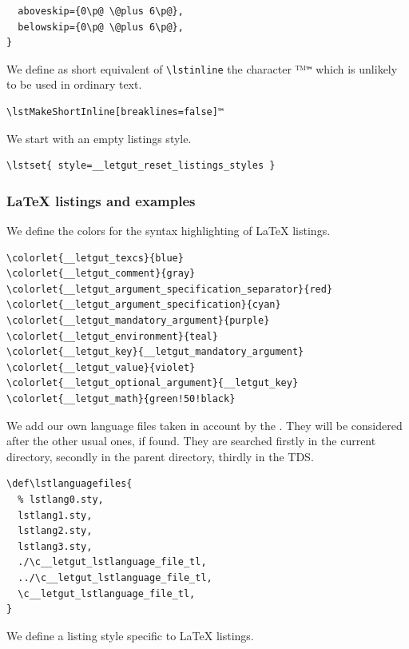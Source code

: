 \documentclass{letgut}
\begin{document}
\begin{lstlisting}
  aboveskip={0\p@ \@plus 6\p@},
  belowskip={0\p@ \@plus 6\p@},
}
\end{lstlisting}

We define as short equivalent of \lstinline+\lstinline+ the character
\lstDeleteShortInline™\texttt{™} which is unlikely to be used in ordinary text.

\begin{lstlisting}
\lstMakeShortInline[breaklines=false]™
\end{lstlisting}

We start with an empty listings style.

\begin{lstlisting}
\lstset{ style=__letgut_reset_listings_styles }
\end{lstlisting}
\subsubsection{\LaTeX{} listings and examples}
\label{ImplementationListingsLaTeXlistingsandexamples-xt4h55h0jlj0}
We define the colors for the syntax highlighting of \LaTeX{} listings.

\begin{lstlisting}
\colorlet{__letgut_texcs}{blue}
\colorlet{__letgut_comment}{gray}
\colorlet{__letgut_argument_specification_separator}{red}
\colorlet{__letgut_argument_specification}{cyan}
\colorlet{__letgut_mandatory_argument}{purple}
\colorlet{__letgut_environment}{teal}
\colorlet{__letgut_key}{__letgut_mandatory_argument}
\colorlet{__letgut_value}{violet}
\colorlet{__letgut_optional_argument}{__letgut_key}
\colorlet{__letgut_math}{green!50!black}
\end{lstlisting}

We add our own language files taken in account by the . They
will be considered after the other usual ones, if found. They are searched firstly
in the current directory, secondly in the parent directory, thirdly in the TDS.

\begin{lstlisting}
\def\lstlanguagefiles{
  % lstlang0.sty,
  lstlang1.sty,
  lstlang2.sty,
  lstlang3.sty,
  ./\c__letgut_lstlanguage_file_tl,
  ../\c__letgut_lstlanguage_file_tl,
  \c__letgut_lstlanguage_file_tl,
}
\end{lstlisting}

We define a listing style specific to \LaTeX{} listings.
\end{document}
